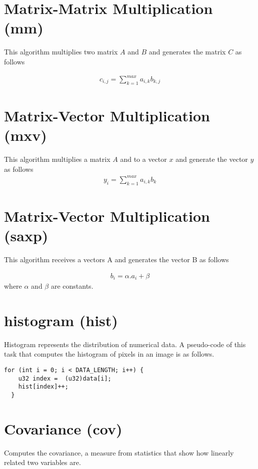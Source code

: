 \documentclass[]{report}
\begin{document}
\section{Matrix-Matrix Multiplication (mm)}

This algorithm multiplies two matrix $A$ and $B$ and generates the matrix $C$ as follows

\begin{align}
c_{i,j}=\sum_{k=1}^{max}a_{i,k}b_{k,j}
\end{align}


\section{Matrix-Vector Multiplication (mxv)}

This algorithm multiplies a matrix $A$ and to a vector $x$ and generate the vector $y$ as follows
\begin{align}
y_{i}=\sum_{k=1}^{max}a_{i,k}b_{k}
\end{align}


\section{Matrix-Vector Multiplication (saxp)}
This algorithm receives a vectors A and generates the vector B as follows 

\begin{align}
b_i=\alpha.a_i+\beta
\end{align}
where $\alpha$ and $\beta$ are constants.


\section{histogram (hist)}
Histogram represents the distribution of numerical data. A pseudo-code of this task that computes the histogram of pixels in an image is as follows.

\begin{lstlisting}[frame=single]  
  for (int i = 0; i < DATA_LENGTH; i++) {
    u32 index =  (u32)data[i];
    hist[index]++;
  }
\end{lstlisting} 

\section{Covariance (cov)\cite{PolyBench_manual}}
Computes the covariance, a measure from statistics that show how linearly related two variables are.
\end{document}
